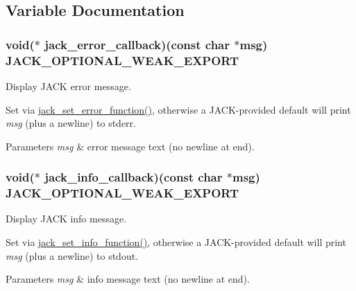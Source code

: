 \subsection{\-Variable \-Documentation}
\hypertarget{group__ErrorOutput_gadabaab075f11a7149f8bc3143d638780}{
\subsubsection[{jack\-\_\-error\-\_\-callback}]{\setlength{\rightskip}{0pt plus 5cm}void($\ast$ {\bf jack\-\_\-error\-\_\-callback})(const char $\ast$msg) {\bf \-J\-A\-C\-K\-\_\-\-O\-P\-T\-I\-O\-N\-A\-L\-\_\-\-W\-E\-A\-K\-\_\-\-E\-X\-P\-O\-R\-T}}}\label{d2/dd9/group__ErrorOutput_gadabaab075f11a7149f8bc3143d638780}
\-Display \-J\-A\-C\-K error message.

\-Set via \hyperlink{group__ErrorOutput_ga550faaef2bb17b03b0068fe094e7b92f}{jack\-\_\-set\-\_\-error\-\_\-function()}, otherwise a \-J\-A\-C\-K-\/provided default will print {\itshape msg\/} (plus a newline) to stderr.


\begin{DoxyParams}{\-Parameters}
{\em msg} & error message text (no newline at end). \\
\hline
\end{DoxyParams}
\hypertarget{group__ErrorOutput_ga4fd590171478e9ef1c0686c8911041b7}{
\subsubsection[{jack\-\_\-info\-\_\-callback}]{\setlength{\rightskip}{0pt plus 5cm}void($\ast$ {\bf jack\-\_\-info\-\_\-callback})(const char $\ast$msg) {\bf \-J\-A\-C\-K\-\_\-\-O\-P\-T\-I\-O\-N\-A\-L\-\_\-\-W\-E\-A\-K\-\_\-\-E\-X\-P\-O\-R\-T}}}\label{d2/dd9/group__ErrorOutput_ga4fd590171478e9ef1c0686c8911041b7}
\-Display \-J\-A\-C\-K info message.

\-Set via \hyperlink{group__ErrorOutput_ga1555b7b4ae4056a42c70a3fa278ae17f}{jack\-\_\-set\-\_\-info\-\_\-function()}, otherwise a \-J\-A\-C\-K-\/provided default will print {\itshape msg\/} (plus a newline) to stdout.


\begin{DoxyParams}{\-Parameters}
{\em msg} & info message text (no newline at end). \\
\hline
\end{DoxyParams}
